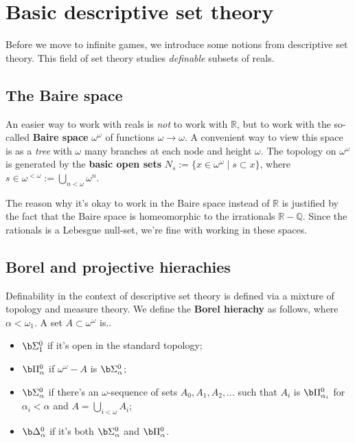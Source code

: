 \newcommand{\mytitle}{Determinacy -- seminar}



\section{Basic descriptive set theory}

Before we move to infinite games, we introduce some notions from descriptive set theory. This field of set theory studies \textit{definable} subsets of reals.\\

\subsection{The Baire space}
An easier way to work with reals is \textit{not} to work with $\mathbb R$, but to work with the so-called \textbf{Baire space} $\omega^\omega$ of functions $\omega\to\omega$. A convenient way to view this space is as a \textit{tree} with $\omega$ many branches at each node and height $\omega$. The topology on $\omega^\omega$ is generated by the \textbf{basic open sets} $N_s:=\{x\in\omega^\omega\mid s\subset x\}$, where $s\in\omega^{<\omega}:=\bigcup_{n<\omega}\omega^n$.

\qquad The reason why it's okay to work in the Baire space instead of $\mathbb R$ is justified by the fact that the Baire space is homeomorphic to the irrationals $\mathbb R-\mathbb Q$. Since the rationals is a Lebesgue null-set, we're fine with working in these spaces.\\


\subsection{Borel and projective hierachies}

Definability in the context of descriptive set theory is defined via a mixture of topology and measure theory. We define the \textbf{Borel hierachy} as follows, where $\alpha<\omega_1$. A set $A\subset\omega^\omega$ is..
\begin{itemize}
\item $\b\Sigma^0_1$ if it's open in the standard topology;
\item $\b\Pi^0_\alpha$ if $\omega^\omega-A$ is $\b\Sigma^0_\alpha$;
\item $\b\Sigma^0_\alpha$ if there's an $\omega$-sequence of sets $A_0,A_1,A_2,\hdots$ such that $A_i$ is $\b\Pi^0_{\alpha_i}$ for $\alpha_i<\alpha$ and $A=\bigcup_{i<\omega}A_i$;
\item $\b\Delta^0_\alpha$ if it's both $\b\Sigma^0_\alpha$ and $\b\Pi^0_\alpha$.\\
\end{itemize}

